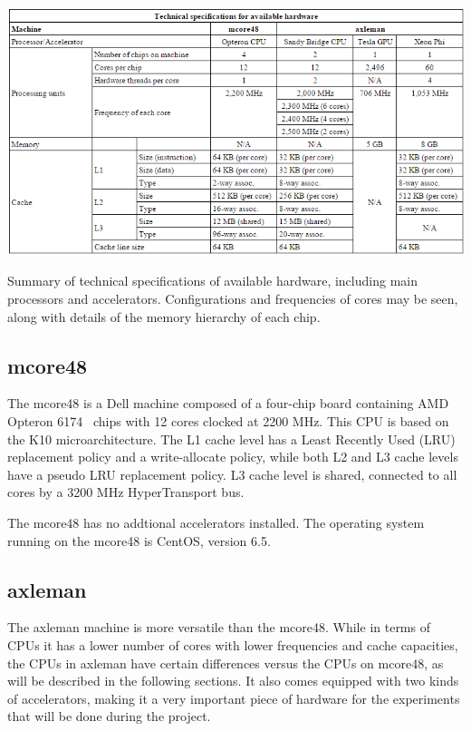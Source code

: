 \begin{table}[!ht]
\begin{center}
\centerline{\includegraphics[width=\columnwidth]{img/hwsum}}
\caption[Summary of technical specifications of available hardware.]{Summary of technical specifications of available hardware, including main processors and accelerators. Configurations and frequencies of cores may be seen, along with details of the memory hierarchy of each chip.}
\label{t:hwsum}
\end{center}
\end{table}


\subsection{mcore48}

The mcore48 is a Dell machine composed of a four-chip board containing AMD Opteron 6174~\cite{amd} chips with 12 cores clocked at 2200 MHz. This CPU is based on the K10 microarchitecture. The L1 cache level has a Least Recently Used (LRU) replacement policy and a write-allocate policy, while both L2 and L3 cache levels have a pseudo LRU replacement policy. L3 cache level is shared, connected to all cores by a 3200 MHz HyperTransport bus.

The mcore48 has no addtional accelerators installed. The operating system running on the mcore48 is CentOS, version 6.5.

\subsection{axleman}

The axleman machine is more versatile than the mcore48. While in terms of CPUs it has a lower number of cores with lower frequencies and cache capacities, the CPUs in axleman have certain differences versus the CPUs on mcore48, as will be described in the following sections. It also comes equipped with two kinds of accelerators, making it a very important piece of hardware for the experiments that will be done during the project.

